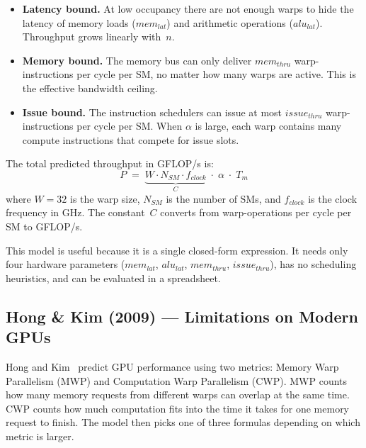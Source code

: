 \begin{itemize}
  \item \textbf{Latency bound.}
    At low occupancy there are not enough warps to hide the latency of
    memory loads ($mem_{lat}$) and arithmetic operations ($alu_{lat}$).
    Throughput grows linearly with~$n$.

  \item \textbf{Memory bound.}
    The memory bus can only deliver $mem_{thru}$ warp-instructions per cycle
    per SM, no matter how many warps are active.
    This is the effective bandwidth ceiling.

  \item \textbf{Issue bound.}
    The instruction schedulers can issue at most $issue_{thru}$ warp-instructions
    per cycle per SM.
    When $\alpha$ is large, each warp contains many compute instructions that
    compete for issue slots.
\end{itemize}

The total predicted throughput in GFLOP/s is:
%
\begin{equation}
P \;=\; \underbrace{W \cdot N_{SM} \cdot f_{clock}}_{C} \;\cdot\; \alpha \;\cdot\; T_m
\label{eq:gflops}
\end{equation}
%
where $W = 32$ is the warp size, $N_{SM}$ is the number of SMs, and
$f_{clock}$ is the clock frequency in GHz.
The constant~$C$ converts from warp-operations per cycle per SM to GFLOP/s.

This model is useful because it is a single closed-form expression.
It needs only four hardware parameters ($mem_{lat}$, $alu_{lat}$,
$mem_{thru}$, $issue_{thru}$), has no scheduling heuristics,
and can be evaluated in a spreadsheet.


\subsection{Hong \& Kim (2009) --- Limitations on Modern GPUs}
\label{subsec:hong_kim}

Hong and Kim~\cite{hong2009analytical} predict GPU performance using two
metrics: Memory Warp Parallelism (MWP) and Computation Warp Parallelism (CWP).
MWP counts how many memory requests from different warps can overlap at the
same time.
CWP counts how much computation fits into the time it takes for one memory
request to finish.
The model then picks one of three formulas depending on which
metric is larger.

